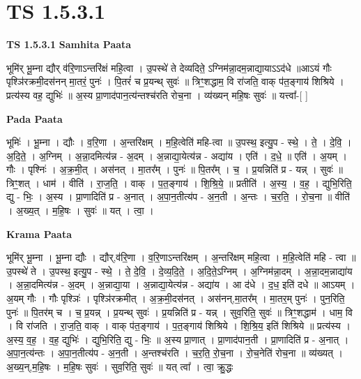 \documentclass[17pt]{extarticle}
\begin{document}
\section{ TS 1.5.3.1 }

\textbf{TS 1.5.3.1 } \newline
\textbf{Samhita Paata} \newline

भूमि॑र् भू॒म्ना द्यौर् व॑रि॒णाऽन्तरि॑क्षं महि॒त्वा । उ॒पस्थे॑ ते देव्यदिते॒ ऽग्निम॑न्ना॒दम॒न्नाद्या॒याऽऽद॑धे ॥आऽयं गौः पृश्ञि॑रक्रमी॒दस॑नन् मा॒तरं॒ पुनः॑ । पि॒तरं॑ च प्र॒यन्थ् सुवः॑ ॥ त्रिꣳ॒॒शद्धाम॒ वि रा॑जति॒ वाक् प॑त॒ङ्गाय॑ शिश्रिये । प्रत्य॑स्य वह॒ द्युभिः॑ ॥ अ॒स्य प्रा॒णाद॑पान॒त्य॑न्तश्च॑रति रोच॒ना । व्य॑ख्यन् महि॒षः सुवः॑ ॥ यत्त्वा᳚-[ ] \newline

\textbf{Pada Paata} \newline

भूमिः॑ । भू॒म्ना । द्यौः । व॒रि॒णा । अ॒न्तरि॑क्षम् । म॒हि॒त्वेति॑ महि-त्वा ॥ उ॒पस्थ॒ इत्यु॒प - स्थे॒ । ते॒ । दे॒वि॒ । अ॒दि॒ते॒ । अ॒ग्निम् । अ॒न्ना॒दमित्य॑न्न - अ॒दम् । अ॒न्नाद्या॒येत्य॑न्न - अद्या॑य । एति॑ । द॒धे॒ ॥ एति॑ । अ॒यम् । गौः । पृश्निः॑ । अ॒क्र॒मी॒त् । अस॑नत् । मा॒तर᳚म् । पुनः॑ ॥ पि॒तर᳚म् । च॒ । प्र॒यन्निति॑ प्र - यन्न् । सुवः॑ ॥ त्रिꣳ॒॒शत् । धाम॑ । वीति॑ । रा॒ज॒ति॒ । वाक् । प॒त॒ङ्गाय॑ । शि॒श्रि॒ये॒ ॥ प्रतीति॑ । अ॒स्य॒ । व॒ह॒ । द्युभि॒रिति॒ द्यु - भिः॒ । अ॒स्य । प्रा॒णादिति॑ प्र - अ॒नात् । अ॒पा॒न॒तीत्य॑प - अ॒न॒ती । अ॒न्तः । च॒र॒ति॒ । रो॒च॒ना ॥ वीति॑ । अ॒ख्य॒त् । म॒हि॒षः । सुवः॑ ॥ यत् । त्वा॒ ।  \newline


\textbf{Krama Paata} \newline

भूमि॑र् भू॒म्ना । भू॒म्ना द्यौः । द्यौर्,व॑रि॒णा । व॒रि॒णाऽन्तरि॑क्षम् । अ॒न्तरि॑क्षम् महि॒त्वा । म॒हि॒त्वेति॑ महि - त्वा ॥ उ॒पस्थे॑ ते । उ॒पस्थ॒ इत्यु॒प - स्थे॒ । ते॒ दे॒वि॒ । दे॒व्य॒दि॒ते॒ । अ॒दि॒ते॒ऽग्निम् । अ॒ग्निम॑न्ना॒दम् । अ॒न्ना॒दम॒न्नाद्या॑य । अ॒न्ना॒दमित्य॑न्न - अ॒दम् । अ॒न्नाद्या॒या । अ॒न्नाद्या॒येत्य॑न्न - अद्या॑य । आ द॑धे । द॒ध॒ इति॑ दधे ॥ आऽयम् । अ॒यम् गौः । गौः पृश्ञिः॑ । पृश्ञि॑रक्रमीत् । अ॒क्र॒मी॒दस॑नत् । अस॑नन्,मा॒तर᳚म् । मा॒तर॒म् पुनः॑ । पुन॒रिति॒ पुनः॑ ॥ पि॒तर॑म् च । च॒ प्र॒यन्न् । प्र॒यन्थ् सुवः॑ । प्र॒यन्निति॑ प्र - यन्न् । सुव॒रिति॒ सुवः॑ ॥ त्रिꣳ॒॒शद्धाम॑ । धाम॒ वि । वि रा॑जति । रा॒ज॒ति॒ वाक् । वाक् प॑त॒ङ्गाय॑ । प॒त॒ङ्गाय॑ शिश्रिये । शि॒श्रि॒य॒ इति॑ शिश्रिये ॥ प्रत्य॑स्य । अ॒स्य॒ व॒ह॒ । व॒ह॒ द्युभिः॑ । द्युभि॒रिति॒ द्यु - भिः॒ ॥ अ॒स्य प्रा॒णात् । प्रा॒णाद॑पान॒ती । प्रा॒णादिति॑ प्र - अ॒नात् । अ॒पा॒न॒त्य॑न्तः । अ॒पा॒न॒तीत्य॑प - अ॒न॒ती । अ॒न्तश्च॑रति । च॒र॒ति॒ रो॒च॒ना । रो॒च॒नेति॑ रोच॒ना ॥ व्य॑ख्यत् । अ॒ख्य॒न्,म॒हि॒षः । म॒हि॒षः सुवः॑ । सुव॒रिति॒ सुवः॑ ॥ यत् त्वा᳚ । त्वा॒ क्रु॒द्धः \newline
\end{document}
